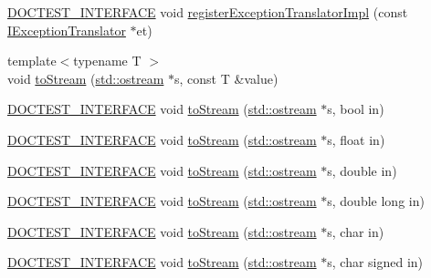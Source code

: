 \begin{DoxyCompactItemize}
\mbox{\hyperlink{doctest_8h_a9c16ffc635ec47f07797d21ede26b1a5}{D\+O\+C\+T\+E\+S\+T\+\_\+\+I\+N\+T\+E\+R\+F\+A\+CE}} void \mbox{\hyperlink{namespacedoctest_1_1detail_a3887426da16e0d12e6f0e270a767a6a5}{register\+Exception\+Translator\+Impl}} (const \mbox{\hyperlink{structdoctest_1_1detail_1_1_i_exception_translator}{I\+Exception\+Translator}} $\ast$et)
\item 
{\footnotesize template$<$typename T $>$ }\\void \mbox{\hyperlink{namespacedoctest_1_1detail_a71b40611173c82709726b36715229179}{to\+Stream}} (\mbox{\hyperlink{doctest_8h_a116af65cb5e924b33ad9d9ecd7a783f3}{std\+::ostream}} $\ast$s, const T \&value)
\item 
\mbox{\hyperlink{doctest_8h_a9c16ffc635ec47f07797d21ede26b1a5}{D\+O\+C\+T\+E\+S\+T\+\_\+\+I\+N\+T\+E\+R\+F\+A\+CE}} void \mbox{\hyperlink{namespacedoctest_1_1detail_a54f817dd0c3e33a4f96de3e638d4c559}{to\+Stream}} (\mbox{\hyperlink{doctest_8h_a116af65cb5e924b33ad9d9ecd7a783f3}{std\+::ostream}} $\ast$s, bool in)
\item 
\mbox{\hyperlink{doctest_8h_a9c16ffc635ec47f07797d21ede26b1a5}{D\+O\+C\+T\+E\+S\+T\+\_\+\+I\+N\+T\+E\+R\+F\+A\+CE}} void \mbox{\hyperlink{namespacedoctest_1_1detail_ac0ab7be576543b52b480df7f44ee13c5}{to\+Stream}} (\mbox{\hyperlink{doctest_8h_a116af65cb5e924b33ad9d9ecd7a783f3}{std\+::ostream}} $\ast$s, float in)
\item 
\mbox{\hyperlink{doctest_8h_a9c16ffc635ec47f07797d21ede26b1a5}{D\+O\+C\+T\+E\+S\+T\+\_\+\+I\+N\+T\+E\+R\+F\+A\+CE}} void \mbox{\hyperlink{namespacedoctest_1_1detail_aa0aa6b2f4cd2ab8cc0b5c4c6a1745e05}{to\+Stream}} (\mbox{\hyperlink{doctest_8h_a116af65cb5e924b33ad9d9ecd7a783f3}{std\+::ostream}} $\ast$s, double in)
\item 
\mbox{\hyperlink{doctest_8h_a9c16ffc635ec47f07797d21ede26b1a5}{D\+O\+C\+T\+E\+S\+T\+\_\+\+I\+N\+T\+E\+R\+F\+A\+CE}} void \mbox{\hyperlink{namespacedoctest_1_1detail_aa7f9d8383116a268a72993244a43d74d}{to\+Stream}} (\mbox{\hyperlink{doctest_8h_a116af65cb5e924b33ad9d9ecd7a783f3}{std\+::ostream}} $\ast$s, double long in)
\item 
\mbox{\hyperlink{doctest_8h_a9c16ffc635ec47f07797d21ede26b1a5}{D\+O\+C\+T\+E\+S\+T\+\_\+\+I\+N\+T\+E\+R\+F\+A\+CE}} void \mbox{\hyperlink{namespacedoctest_1_1detail_aee32c9e6a9e1b419c6feb44e8c1b6205}{to\+Stream}} (\mbox{\hyperlink{doctest_8h_a116af65cb5e924b33ad9d9ecd7a783f3}{std\+::ostream}} $\ast$s, char in)
\item 
\mbox{\hyperlink{doctest_8h_a9c16ffc635ec47f07797d21ede26b1a5}{D\+O\+C\+T\+E\+S\+T\+\_\+\+I\+N\+T\+E\+R\+F\+A\+CE}} void \mbox{\hyperlink{namespacedoctest_1_1detail_aba277e0f00b9cf14b7161bbe033b126f}{to\+Stream}} (\mbox{\hyperlink{doctest_8h_a116af65cb5e924b33ad9d9ecd7a783f3}{std\+::ostream}} $\ast$s, char signed in)

\end{DoxyCompactItemize}
